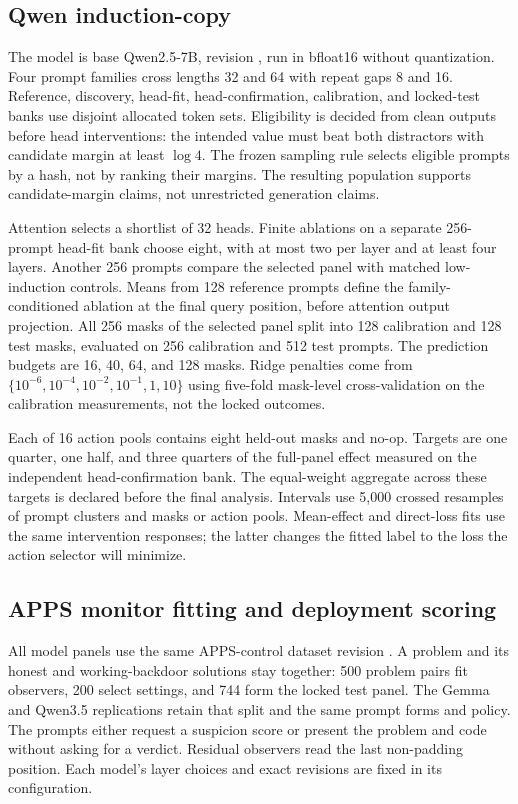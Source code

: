 \subsection{Qwen induction-copy}

The model is base Qwen2.5-7B, revision
, run in bfloat16 without
quantization. Four prompt families cross lengths 32 and 64 with repeat gaps
8 and 16. Reference, discovery, head-fit, head-confirmation, calibration,
and locked-test banks use disjoint allocated token sets. Eligibility is
decided from clean outputs before head interventions: the intended value
must beat both distractors with candidate margin at least $\log 4$.
The frozen sampling rule selects eligible prompts by a hash, not by ranking
their margins. The resulting population supports candidate-margin claims,
not unrestricted generation claims.

Attention selects a shortlist of 32 heads. Finite ablations on a separate
256-prompt head-fit bank choose eight, with at most two per layer and at least
four layers. Another 256 prompts compare the selected panel with matched
low-induction controls. Means from 128 reference prompts define the
family-conditioned ablation at the final query position, before attention
output projection. All 256 masks of the selected panel split into 128
calibration and 128 test masks, evaluated on 256 calibration and 512 test
prompts. The prediction budgets are 16, 40, 64, and 128 masks. Ridge penalties
come from $\{10^{-6},10^{-4},10^{-2},10^{-1},1,10\}$ using five-fold
mask-level cross-validation on the calibration measurements, not the locked
outcomes.

Each of 16 action pools contains eight held-out masks and no-op. Targets are
one quarter, one half, and three quarters of the full-panel effect measured
on the independent head-confirmation bank. The equal-weight aggregate across
these targets is declared before the final analysis. Intervals use 5,000
crossed resamples of prompt clusters and masks or action pools. Mean-effect
and direct-loss fits use the same intervention responses; the latter changes
the fitted label to the loss the action selector will minimize.

\subsection{APPS monitor fitting and deployment scoring}

All model panels use the same APPS-control dataset revision
. A problem and its honest and
working-backdoor solutions stay together: 500 problem pairs fit observers,
200 select settings, and 744 form the locked test panel. The Gemma and
Qwen3.5 replications retain that split and the same prompt forms and policy.
The prompts either request a suspicion score or present the problem and code
without asking for a verdict. Residual observers read the last non-padding
position. Each model's layer choices and exact revisions are fixed in its
configuration.

